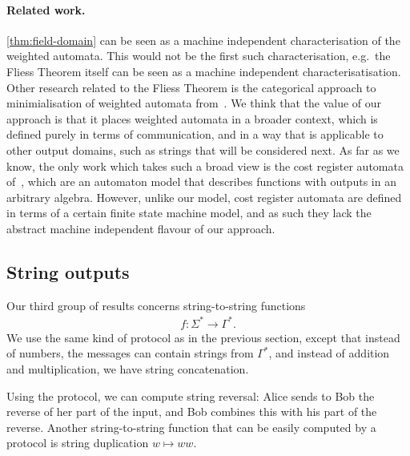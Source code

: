 \paragraph*{Related work.} \cref{thm:field-domain} can be seen as a machine independent characterisation of the weighted automata. This would not be the first such characterisation, e.g.~the Fliess Theorem itself can be seen as a machine independent characterisatisation. Other research related to the Fliess Theorem is the categorical approach to  minimialisation of weighted automata from~\cite{colcombetPetrisan2017}. We think that the value of our approach is that it places weighted automata in a broader context, which is defined purely in terms of communication, and in a way that is applicable to  other output domains, such as strings that will be considered next. As far as we know, the only  work  which takes such a broad view is the cost register automata of~\cite[Section C]{alurDantoniDeshmukhYuan2013}, which are an automaton model that describes functions with outputs in an arbitrary algebra. However, unlike our model, cost register automata are defined in terms of a certain finite state machine model, and as such they lack the abstract machine independent flavour of our approach.

\subsection{String outputs}
\label{sec:intro-strings}

Our third group of results concerns string-to-string functions
\begin{align*}
f : \Sigma^* \to \Gamma^*.
\end{align*}
We  use the same kind of protocol as in the previous section, except that instead of numbers, the messages can contain strings from $\Gamma^*$, and instead of addition and multiplication, we have string concatenation.  

\begin{myexample}\label{ex:reverse-duplicate}
    Using the protocol, we can compute string reversal: Alice sends to Bob the reverse of her part of the input, and  Bob combines this with  his part of the reverse. Another string-to-string function that can be easily computed by a protocol is string duplication $w \mapsto ww$. 
\end{myexample}

